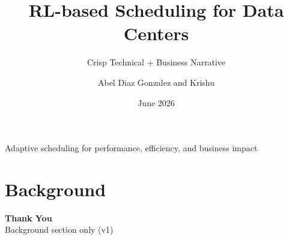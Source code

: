 \documentclass[aspectratio=169]{beamer}
\title[RL Scheduling for DCs]{RL-based Scheduling for Data Centers}
\subtitle{Crisp Technical + Business Narrative}
\author[A. Diaz Gonzalez \& K. Team]{Abel Diaz Gonzalez and Krishu}
\institute[Lab / BU]{Lab / BU Collaboration}
\date{June 2026}
\begin{document}
\begin{frame}
  \titlepage
  \vspace{-0.5em}
  \begin{center}
    \small\color{DeepBlue}Adaptive scheduling for performance, efficiency, and business impact
  \end{center}
\end{frame}

\section{Background}


\begin{frame}
  \centering
  \Huge\textbf{Thank You}\\[0.8em]
  \large Background section only (v1)
\end{frame}
\end{document}
